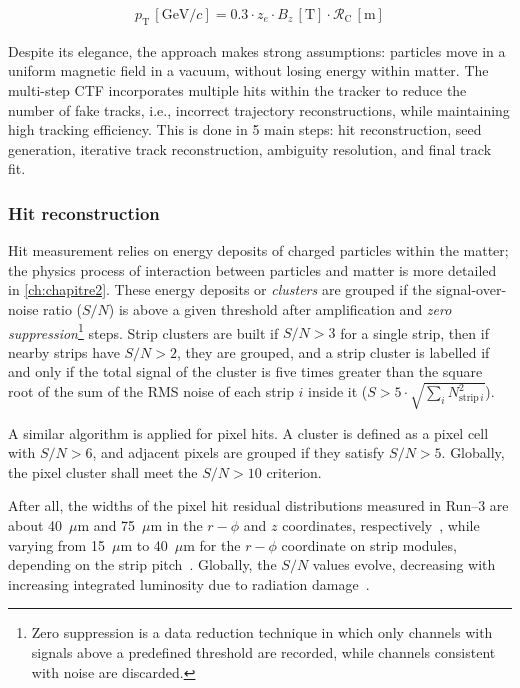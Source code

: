 \begin{align}
    p_{\mathrm{T}} \, [\textrm{GeV}/c] = 0.3 \cdot z_e \cdot B_z \, [\textrm{T}] \cdot \mathcal{R}_\textrm{C} \, [\textrm{m}]
    \label{eq:ptreconstruction}
\end{align}

Despite its elegance, the approach makes strong assumptions: particles move in a uniform magnetic field in a vacuum, without losing energy within matter. The multi-step CTF incorporates multiple hits within the tracker to reduce the number of fake tracks, i.e., incorrect trajectory reconstructions, while maintaining high tracking efficiency. This is done in 5 main steps: hit reconstruction, seed generation, iterative track reconstruction, ambiguity resolution, and final track fit.


\subsubsection{Hit reconstruction}
\label{subsubsection:Hitreconstruction}

Hit measurement relies on energy deposits of charged particles within the matter; the physics process of interaction between particles and matter is more detailed in \cref{ch:chapitre2}. These energy deposits or \textit{clusters} are grouped if the signal-over-noise ratio ($S/N$) is above a given threshold after amplification and \textit{zero suppression}\footnote{Zero suppression is a data reduction technique in which only channels with signals above a predefined threshold are recorded, while channels consistent with noise are discarded.} steps. Strip clusters are built if $S/N>3$ for a single strip, then if nearby strips have $S/N>2$, they are grouped, and a strip cluster is labelled if and only if the total signal of the cluster is five times greater than the square root of the sum of the RMS noise of each strip $i$ inside it ($S>5\cdot \sqrt{\sum_i N_{\mathrm{strip}\,i}^2}$).

A similar algorithm is applied for pixel hits. A cluster is defined as a pixel cell with $S/N>6$, and adjacent pixels are grouped if they satisfy $S/N>5$. Globally, the pixel cluster shall meet the $S/N>10$ criterion.

After all, the widths of the pixel hit residual distributions measured in Run--3 are about 40~$\mu$m and 75~$\mu$m in the $r{-}\phi$ and $z$ coordinates, respectively~\cite{pixelHitresolution}, while varying from 15~$\mu$m to 40~$\mu$m for the $r{-}\phi$ coordinate on strip modules, depending on the strip pitch~\cite{CMS-DP-2024-101}. Globally, the $S/N$ values evolve, decreasing with increasing integrated luminosity due to radiation damage~\cite{CMS-DP-2024-101}.

